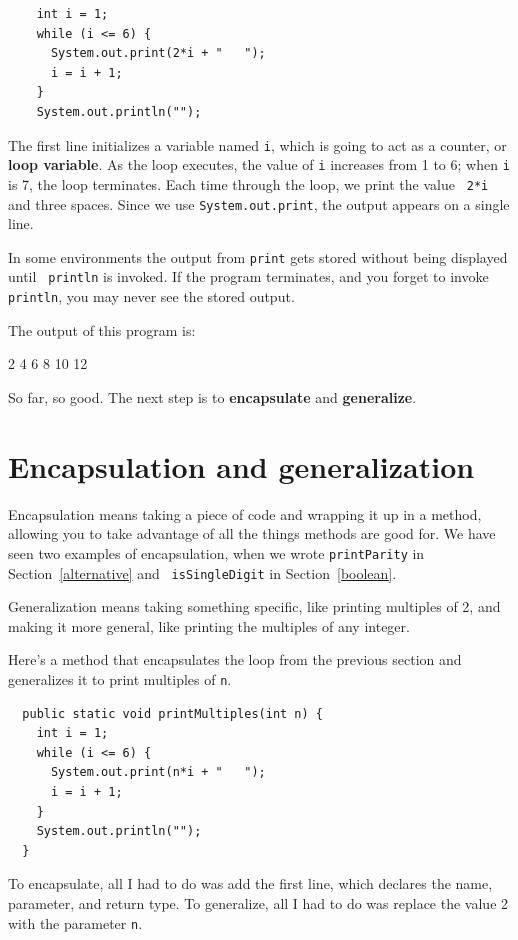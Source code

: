 \begin{lstlisting}
    int i = 1;
    while (i <= 6) {
      System.out.print(2*i + "   ");
      i = i + 1;
    }
    System.out.println("");
\end{lstlisting}
%
The first line initializes a variable named {\tt i}, which is going
to act as a counter, or {\bf loop variable}.  As the loop executes,
the value of {\tt i} increases from 1 to 6; when {\tt i} is 7, the
loop terminates.  Each time through the loop, we print the value {\tt
  2*i} and three spaces.  Since we use {\tt System.out.print},
the output appears on a single line.


In some environments the
output from {\tt print} gets stored without being displayed until {\tt
println} is invoked.  If the program terminates, and you forget to
invoke {\tt println}, you may never see the stored output.

The output of this program is:

\begin{stdout}
2   4   6   8   10   12
\end{stdout}
%
So far, so good.  The next step is to {\bf encapsulate} and {\bf
generalize}.


\section {Encapsulation and generalization}
\label{encapsulation}

Encapsulation means taking a piece of code and wrapping it up
in a method, allowing you to take advantage of all the things methods
are good for.  We have seen two examples of encapsulation, when we
wrote {\tt printParity} in Section~\ref{alternative} and {\tt
isSingleDigit} in Section~\ref{boolean}.

Generalization means taking something specific, like printing
multiples of 2, and making it more general, like printing the
multiples of any integer.

Here's a method that encapsulates the loop from the previous
section and generalizes it to print multiples of {\tt n}.

\begin{lstlisting}
  public static void printMultiples(int n) {
    int i = 1;
    while (i <= 6) {
      System.out.print(n*i + "   ");
      i = i + 1;
    }
    System.out.println("");
  }
\end{lstlisting}
%
To encapsulate, all I had to do was add the first line,
which declares the name, parameter,
and return type.  To generalize, all I had to do was replace
the value 2 with the parameter {\tt n}.

